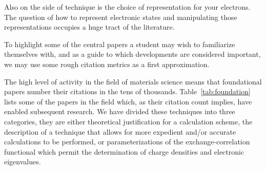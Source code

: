 Also on the side of technique is the choice of representation for your electrons.
The question of how to represent electronic states and manipulating those representations
occupies a huge tract of the literature.

To highlight some of the central papers a student may wish to familiarize themselves with,
and as a guide to which developments are considered important, we may
use some rough citation metrics as a first approximation. 

The high level of activity in the field of materials science 
means that foundational papers number their citations in the tens of thousands. 
Table~\ref{tab:foundation} lists some of the papers in the field which, as
their citation count implies, have enabled subsequent research. 
We have divided these techniques into three categories, 
they are either theoretical justification for a calculation scheme, the description of
a technique that allows for more expedient and/or accurate calculations to be performed, 
or parameterizations of the exchange-correlation functional which permit the determination
of charge densities and electronic eigenvalues.

\begin{table}
\caption{Citations are relevant up to Nov. 2017. Citations are according 
to the journals in which they appear. 
The actual number of citations are much higher. 
\label{tab:theoreticalpapers}}
\end{table}

